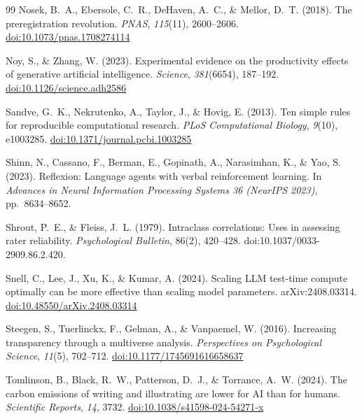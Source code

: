 \documentclass[12pt,a4paper]{article}
\begin{document}
\begin{thebibliography}{99}
Nosek, B.~A., Ebersole, C.~R., DeHaven, A.~C., \& Mellor, D.~T. (2018).
The preregistration revolution.
\textit{PNAS}, \textit{115}(11), 2600--2606.
\href{https://doi.org/10.1073/pnas.1708274114}{doi:10.1073/pnas.1708274114}

Noy, S., \& Zhang, W. (2023).
Experimental evidence on the productivity effects of generative artificial
  intelligence.
\textit{Science}, \textit{381}(6654), 187--192.
\href{https://doi.org/10.1126/science.adh2586}{doi:10.1126/science.adh2586}

Sandve, G.~K., Nekrutenko, A., Taylor, J., \& Hovig, E. (2013).
Ten simple rules for reproducible computational research.
\textit{PLoS Computational Biology}, \textit{9}(10), e1003285.
\href{https://doi.org/10.1371/journal.pcbi.1003285}{doi:10.1371/journal.pcbi.1003285}

Shinn, N., Cassano, F., Berman, E., Gopinath, A., Narasimhan, K., \& Yao, S.
  (2023).
Reflexion: Language agents with verbal reinforcement learning.
In \textit{Advances in Neural Information Processing Systems 36 (NeurIPS 2023)},
  pp.~8634--8652.

Shrout, P.~E., \& Fleiss, J.~L. (1979). Intraclass correlations: Uses in
assessing rater reliability. \emph{Psychological Bulletin}, 86(2), 420--428.
doi:10.1037/0033-2909.86.2.420.

Snell, C., Lee, J., Xu, K., \& Kumar, A. (2024).
Scaling LLM test-time compute optimally can be more effective than scaling model
  parameters.
arXiv:2408.03314.
\href{https://doi.org/10.48550/arXiv.2408.03314}{doi:10.48550/arXiv.2408.03314}

Steegen, S., Tuerlinckx, F., Gelman, A., \& Vanpaemel, W. (2016).
Increasing transparency through a multiverse analysis.
\textit{Perspectives on Psychological Science}, \textit{11}(5), 702--712.
\href{https://doi.org/10.1177/1745691616658637}{doi:10.1177/1745691616658637}

Tomlinson, B., Black, R.~W., Patterson, D.~J., \& Torrance, A.~W. (2024).
The carbon emissions of writing and illustrating are lower for AI than for
  humans.
\textit{Scientific Reports}, \textit{14}, 3732.
\href{https://doi.org/10.1038/s41598-024-54271-x}{doi:10.1038/s41598-024-54271-x}


\end{thebibliography}
\end{document}
